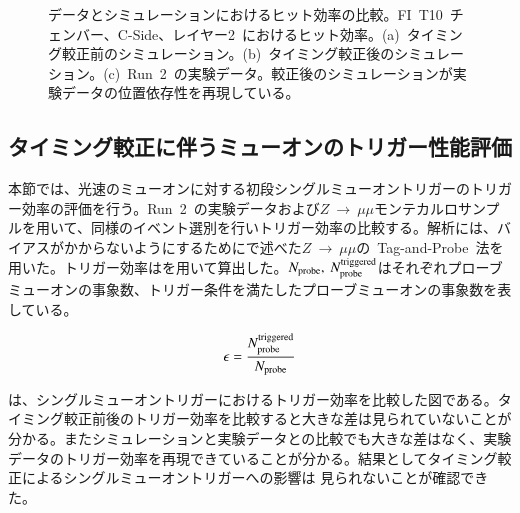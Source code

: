 \begin{figure}[H]
\begin{minipage}{0.99\hsize}
	\subcaption{}
	\end{minipage}
	\caption[データとシミュレーションにおけるヒット効率の比較]{データとシミュレーションにおけるヒット効率の比較。FI~T10~チェンバー、C-Side、レイヤー2~におけるヒット効率。(a)~タイミング較正前のシミュレーション。(b)~タイミング較正後のシミュレーション。(c)~Run~2~の実験データ。較正後のシミュレーションが実験データの位置依存性を再現している。}
	\label{fig:hiteff}
\end{figure}


\subsection{タイミング較正に伴うミューオンのトリガー性能評価}
本節では、光速のミューオンに対する初段シングルミューオントリガーのトリガー効率の評価を行う。Run~2~の実験データおよび$Z~→~\mu\mu$モンテカルロサンプルを用いて、同様のイベント選別を行いトリガー効率の比較する。解析には、バイアスがかからないようにするためにで述べた$Z~→~\mu\mu$の~Tag-and-Probe~法を用いた。トリガー効率はを用いて算出した。$N_{\rm{probe}},~N_{\rm{probe}}^{\rm{triggered}}$はそれぞれプローブミューオンの事象数、トリガー条件を満たしたプローブミューオンの事象数を表している。

\begin{align}
    \epsilon=\frac{N_{\rm{probe}}^{\rm{triggered}}}{N_{\rm{probe}}}
    \label{eq:eff}
\end{align}

は、シングルミューオントリガーにおけるトリガー効率を比較した図である。タイミング較正前後のトリガー効率を比較すると大きな差は見られていないことが分かる。またシミュレーションと実験データとの比較でも大きな差はなく、実験データのトリガー効率を再現できていることが分かる。結果としてタイミング較正によるシングルミューオントリガーへの影響は
見られないことが確認できた。

